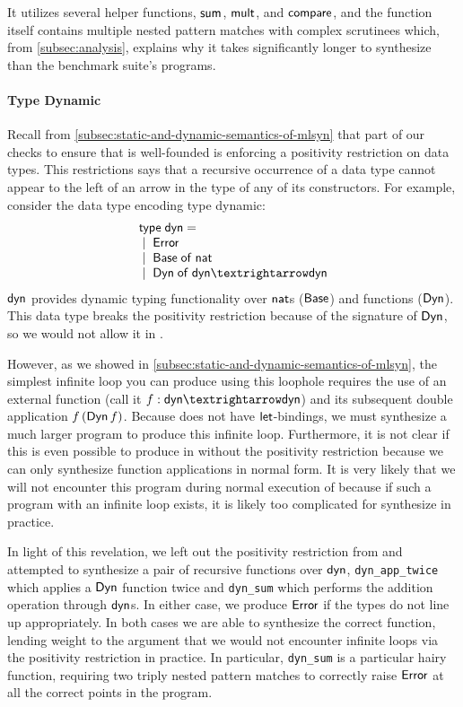 It utilizes several helper functions, $\mathsf{sum}$, $\mathsf{mult}$, and $\mathsf{compare}$, and the function itself contains multiple nested pattern matches with complex scrutinees which, from \autoref{subsec:analysis}, explains why it takes significantly longer to synthesize than the benchmark suite's programs.

\paragraph{Type Dynamic}

Recall from \autoref{subsec:static-and-dynamic-semantics-of-mlsyn} that part of our checks to ensure that \mlsyn{} is well-founded is enforcing a positivity restriction on data types.
This restrictions says that a recursive occurrence of a data type cannot appear to the left of an arrow in the type of any of its constructors.
For example, consider the data type encoding type dynamic:
\[
  \begin{array}{l}
    \mkwd{type}\;\mdyn = \\
    \bnfalt \mError \\
    \bnfalt \mBase\;\mof\;\mnat \\
    \bnfalt \mDyn\;\mof\;\mdyn → \mdyn
  \end{array}
\]
$\mathsf{dyn}$ provides dynamic typing functionality over $\mathsf{nat}$s ($\mathsf{Base}$) and functions ($\mathsf{Dyn}$).
This data type breaks the positivity restriction because of the signature of $\mathsf{Dyn}$, so we would not allow it in \mlsyn{}.

However, as we showed in \autoref{subsec:static-and-dynamic-semantics-of-mlsyn}, the simplest infinite loop you can produce using this loophole requires the use of an external function (call it $f : \mdyn → \mdyn$) and its subsequent double application $f\,(\mathsf{Dyn}\,f)$.
Because \mlsyn{} does not have $\mathsf{let}$-bindings, we must synthesize a much larger program to produce this infinite loop.
Furthermore, it is not clear if this is even possible to produce in \mlsyn{} without the positivity restriction because we can only synthesize function applications in normal form.
It is very likely that we will not encounter this program during normal execution of \myth{} because if such a program with an infinite loop exists, it is likely too complicated for \myth{} synthesize in practice.

In light of this revelation, we left out the positivity restriction from \myth{} and attempted to synthesize a pair of recursive functions over $\mathsf{dyn}$, \texttt{dyn\_app\_twice} which applies a $\mathsf{Dyn}$ function twice and \texttt{dyn\_sum} which performs the addition operation through $\mathsf{dyn}$s.
In either case, we produce $\mathsf{Error}$ if the types do not line up appropriately.
In both cases we are able to synthesize the correct function, lending weight to the argument that we would not encounter infinite loops via the positivity restriction in practice.
In particular, \texttt{dyn\_sum} is a particular hairy function, requiring two triply nested pattern matches to correctly raise $\mathsf{Error}$ at all the correct points in the program.

